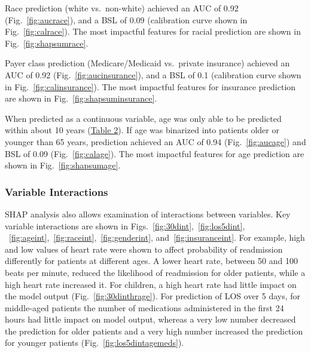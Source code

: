 Race prediction (white vs.\ non-white) achieved an AUC of 0.92 (Fig.\ \ref{fig:aucrace}), 
and a BSL of 0.09 (calibration curve shown in Fig.\ \ref{fig:calrace}).\@
The most impactful features for racial prediction are shown in Fig.\ \ref{fig:shapsumrace}.\@

Payer class prediction (Medicare/Medicaid vs.\ private insurance) achieved an AUC of 0.92 (Fig.\ \ref{fig:aucinsurance}), 
and a BSL of 0.1 (calibration curve shown in Fig.\ \ref{fig:calinsurance}).\@
The most impactful features for insurance prediction are shown in Fig.\ \ref{fig:shapsuminsurance}.\@

When predicted as a continuous variable, age was only able to be predicted within about 10 years (\hyperref[table:table2]{Table 2}).\@
If age was binarized into patients older or younger than 65 years, 
prediction achieved an AUC of 0.94 (Fig.\ \ref{fig:aucage}) and BSL of 0.09 (Fig.\ \ref{fig:calage}).\@
The most impactful features for age prediction are shown in Fig.\ \ref{fig:shapsumage}.\@

\subsubsection{{Variable Interactions}}
SHAP analysis also allows examination of interactions between variables.\@
Key variable interactions are shown in Figs.\ \ref{fig:30dint},~\ref{fig:los5dint},%
~\ref{fig:ageint},~\ref{fig:raceint},~\ref{fig:genderint}, and~\ref{fig:insuranceint}.\@ 
For example, high and low values of heart rate were shown to affect probability of readmission
differently for patients at different ages. A lower heart rate, between 50 and 100 beats per minute,
reduced the likelihood of readmission for older patients, while a high heart rate increased it.\@
For children, a high heart rate had little impact on the model output (Fig.\ \ref{fig:30dinthrage}).\@
For prediction of LOS over 5 days, for middle-aged patients 
the number of medications administered in the first 24 hours had little impact on model output, 
whereas a very low number decreased the prediction for older patients 
and a very high number increased the prediction for younger patients (Fig.\ \ref{fig:los5dintagemeds}).\@
